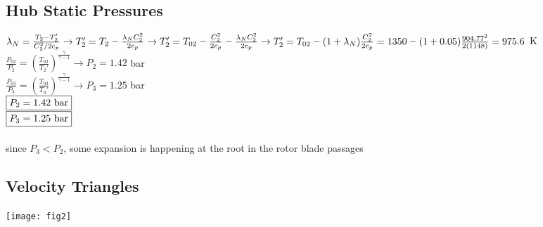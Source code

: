 \documentclass{article}
\begin{document}
\subsection*{Hub Static Pressures}
$\lambda_N=\frac{T_2-T_2'}{C_2^2/2c_p} \rightarrow T_2'=T_2-\frac{\lambda_N C_2^2}{2c_p} \rightarrow
T_2'=T_{02}-\frac{C_2^2}{2c_p}-\frac{\lambda_N C_2^2}{2c_p} \rightarrow \\
T_2'=T_{02}-(1+\lambda_N)\frac{C_2^2}{2c_p}=1350-(1+0.05)\frac{904.77^2}{2(1148)}=975.6$ K \\
$\frac{P_{02}}{P_2}=(\frac{T_{02}}{T_2'})^\frac{\gamma}{\gamma-1} \rightarrow P_2=1.42$ bar \\
$\frac{P_{03}}{P_3}=(\frac{T_{03}}{T_3'})^\frac{\gamma}{\gamma-1} \rightarrow P_3=1.25$ bar \\
$\fbox{$P_2=1.42$ bar}$ \\
$\fbox{$P_3=1.25$ bar}$ \\\\
since $P_3<P_2$, some expansion is happening at the root in the rotor blade passages

\subsection*{Velocity Triangles}
\texttt{[image: fig2]}
\end{document}
